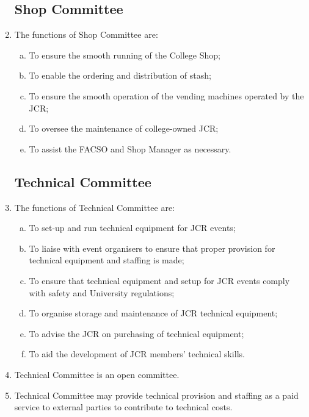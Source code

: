 \documentclass[12pt]{article}
\begin{document}
\begin{enumerate}
    \subsection{Shop Committee}
    \item The functions of Shop Committee are:
    \begin{enumerate}[(a)]
        \item To ensure the smooth running of the College Shop;
        \item To enable the ordering and distribution of stash;
        \item To ensure the smooth operation of the vending machines operated by the JCR;
        \item To oversee the maintenance of college-owned JCR;
        \item To assist the FACSO and Shop Manager as necessary.
    \end{enumerate}
    \subsection{Technical Committee}
    \item The functions of Technical Committee are:
    \begin{enumerate}[(a)]
        \item To set-up and run technical equipment for JCR events;
        \item To liaise with event organisers to ensure that proper provision for technical equipment and staffing is made;
        \item To ensure that technical equipment and setup for JCR events comply with safety and University regulations;
        \item To organise storage and maintenance of JCR technical equipment;
        \item To advise the JCR on purchasing of technical equipment;
        \item To aid the development of JCR members' technical skills.
    \end{enumerate}
    \item Technical Committee is an open committee.
    \item Technical Committee may provide technical provision and staffing as a paid service to external parties to contribute to technical costs.

\end{enumerate}
\end{document}
